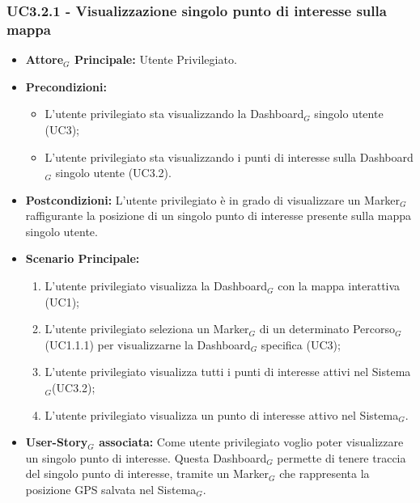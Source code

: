 \documentclass[10pt]{article}
\begin{document}
\begin{justify}
\subsubsection{\textbf{UC3.2.1 - Visualizzazione singolo punto di interesse sulla mappa}}
\label{UC3.2.1}
\begin{itemize}
     \item \textbf{Attore$_G$ Principale:} Utente Privilegiato.
     \item \textbf{Precondizioni:}
        \begin{itemize}
    		\item L'utente privilegiato sta visualizzando la Dashboard$_G$ singolo utente (UC3);
    		\item L'utente privilegiato sta visualizzando i punti di interesse sulla Dashboard$_G$ singolo utente (UC3.2).
        \end{itemize}
     \item \textbf{Postcondizioni:} L'utente privilegiato è in grado di visualizzare un Marker$_G$ raffigurante la posizione di un singolo punto di interesse presente sulla mappa singolo utente.
     \item \textbf{Scenario Principale:}
        \begin{enumerate}
            \item L'utente privilegiato visualizza la Dashboard$_G$ con la mappa interattiva (UC1);
            \item L'utente privilegiato seleziona un Marker$_G$ di un determinato Percorso$_G$ (UC1.1.1) per visualizzarne la Dashboard$_G$ specifica (UC3);
            \item L'utente privilegiato visualizza tutti i punti di interesse attivi nel Sistema$_G$(UC3.2);
            \item L'utente privilegiato visualizza un punto di interesse attivo nel Sistema$_G$.
        \end{enumerate}
     \item \textbf{User-Story$_G$ associata:}
     Come utente privilegiato voglio poter visualizzare un singolo punto di interesse. Questa Dashboard$_G$ permette di tenere traccia del singolo punto di interesse, tramite un Marker$_G$ che rappresenta la posizione GPS salvata nel Sistema$_G$.
\end{itemize}

\end{justify}
\end{document}
